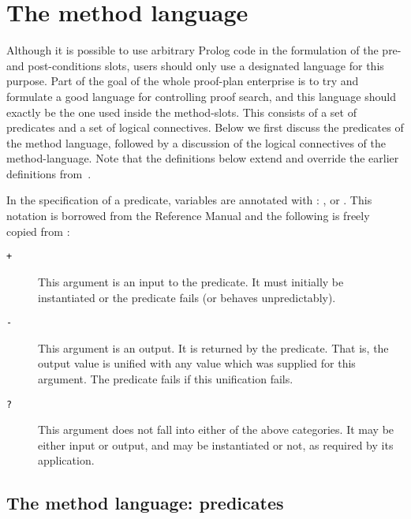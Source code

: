 \def\rcsid{$Id: method_lang.tex,v 1.14 2003/01/22 19:35:23 smaill Exp $}


\section {The method language}
\label{method-language}

Although it is possible to use arbitrary Prolog code in the
formulation of the pre- and post-conditions slots, users should only
use a designated language for this purpose. Part of the goal of the
whole proof-plan enterprise is to try and formulate a good language
for controlling proof search, and this language should exactly be the
one used inside the method-slots. This {\em {}\/}
consists of a set of predicates and a set of logical connectives.
Below we first discuss the predicates of the method language, followed
by a discussion of the logical connectives of the method-language.
\iffalse A summary of the method-language can be found in
appendices~\reference{method-ling-predicates-summary}
and~\reference{method-ling-connectives-summary}.\fi Note that the
definitions below extend and override the earlier definitions
from~\cite{pub349}.

In the specification of a predicate, variables are annotated with
: {\tt \inx{$+$}}, {\tt \inx{$-$}} or {\tt {}}.
This notation is borrowed from the  Reference Manual and
the following is freely copied from \cite{quintus}:
\begin{description}
\item[{\tt +}]
This argument is an input to the predicate. It must initially be
instantiated or the predicate fails (or behaves unpredictably).
\item[{\tt -}]
This argument is an output. It is returned by the predicate. That is,
the output value is unified with any value which was supplied for this
argument. The predicate fails if this unification fails.
\item[{\tt ?}]
This argument does not fall into either of the above categories. It
may be either input or output, and may be instantiated or not, as
required by its application.
\end{description}

\subsection {The method language: predicates}
\label{method-preds}


